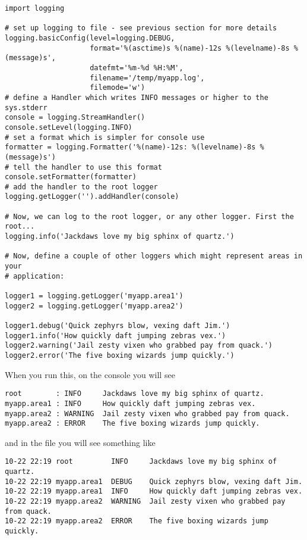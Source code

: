 \begin{verbatim}
import logging

# set up logging to file - see previous section for more details
logging.basicConfig(level=logging.DEBUG,
                    format='%(asctime)s %(name)-12s %(levelname)-8s %(message)s',
                    datefmt='%m-%d %H:%M',
                    filename='/temp/myapp.log',
                    filemode='w')
# define a Handler which writes INFO messages or higher to the sys.stderr
console = logging.StreamHandler()
console.setLevel(logging.INFO)
# set a format which is simpler for console use
formatter = logging.Formatter('%(name)-12s: %(levelname)-8s %(message)s')
# tell the handler to use this format
console.setFormatter(formatter)
# add the handler to the root logger
logging.getLogger('').addHandler(console)

# Now, we can log to the root logger, or any other logger. First the root...
logging.info('Jackdaws love my big sphinx of quartz.')

# Now, define a couple of other loggers which might represent areas in your
# application:

logger1 = logging.getLogger('myapp.area1')
logger2 = logging.getLogger('myapp.area2')

logger1.debug('Quick zephyrs blow, vexing daft Jim.')
logger1.info('How quickly daft jumping zebras vex.')
logger2.warning('Jail zesty vixen who grabbed pay from quack.')
logger2.error('The five boxing wizards jump quickly.')
\end{verbatim}

When you run this, on the console you will see

\begin{verbatim}
root        : INFO     Jackdaws love my big sphinx of quartz.
myapp.area1 : INFO     How quickly daft jumping zebras vex.
myapp.area2 : WARNING  Jail zesty vixen who grabbed pay from quack.
myapp.area2 : ERROR    The five boxing wizards jump quickly.
\end{verbatim}

and in the file you will see something like

\begin{verbatim}
10-22 22:19 root         INFO     Jackdaws love my big sphinx of quartz.
10-22 22:19 myapp.area1  DEBUG    Quick zephyrs blow, vexing daft Jim.
10-22 22:19 myapp.area1  INFO     How quickly daft jumping zebras vex.
10-22 22:19 myapp.area2  WARNING  Jail zesty vixen who grabbed pay from quack.
10-22 22:19 myapp.area2  ERROR    The five boxing wizards jump quickly.
\end{verbatim}

